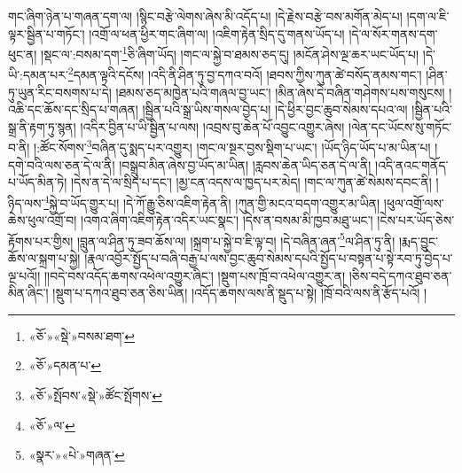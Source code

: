 གང་ཞིག་ཉེན་པ་གཞན་དག་ལ། །སྙིང་བརྩེ་ལེགས་ཞེས་མི་འདོད་པ། །དེ་རྗེས་བརྩེ་བས་མགོན་མེད་པ། །དག་ལ་ཇི་ལྟར་སྦྱིན་པ་གཏོང་། །འགྲོ་ལ་ཕན་ཕྱིར་གང་ཞིག་ལ། །འཇིག་རྟེན་སྲིད་དུ་གནས་ཡོད་པ། །དེ་ལ་སོར་གནས་དག་ཕུང་ན། །སྡང་ལ་:བསམ་དག་\footnote{«ཅོ་»«སྡེ་»བསམ་ཐག་}ཅི་ཞིག་ཡོད། །གང་ལ་སྐྱེ་བ་ཐམས་ཅད་དུ། །མངོན་ཤེས་ལྔ་ཆར་ཡང་ཡོད་པ། །དེ་ཡི་:དམན་པར་\footnote{«ཅོ་»དམན་པ་}དམན་ལྟའི་དངོས། །འདི་ནི་ཤིན་ཏུ་བྱ་དཀའ་བའོ། །ཐབས་ཀྱིས་ཀུན་ཚེ་བསོད་ནམས་གང་། །ཤིན་ཏུ་ཡུན་རིང་བསགས་པ་དེ། །ཐམས་ཅད་མཁྱེན་པའི་གཞལ་བྱ་ཡང་། །མིན་ཞེས་དེ་བཞིན་གཤེགས་པས་གསུངས། །འཆི་དང་ཆོས་དང་སྲིད་པ་གཞན། །སྦྱིན་པའི་སྒྲ་ཡིས་གསལ་བྱེད་པ། །དེ་ཕྱིར་བྱང་ཆུབ་སེམས་དཔའ་ལ། །སྦྱིན་པའི་སྒྲ་ནི་རྟག་ཏུ་སྙན། །འདིར་བྱིན་པ་ཡི་སྦྱིན་པ་ལས། །འབྲས་བུ་ཆེན་པོ་འབྱུང་འགྱུར་ཞེས། །ལེན་དང་ཡོངས་སུ་གཏོང་བ་ནི། །:ཚོང་སོགས་\footnote{«ཅོ་»སྤོབས་«སྡེ་»ཚོང་སྤོགས་}བཞིན་དུ་སྨད་པར་འགྱུར། །གང་ལ་སྔར་བྱས་སྡིག་པ་ཡང་། །ཡོད་ཉིད་ཡོད་པ་མ་ཡིན་པ། །དགེ་བའི་ལས་ཅན་དེ་ལ་ནི། །བསྒྲུབ་མིན་ཞེས་བྱ་ཡོད་མ་ཡིན། །རླབས་ཆེན་ཡིད་ཅན་དེ་ལ་ནི། །འདི་ནའང་གནོད་པ་ཡོད་མིན་ཏེ། །དེས་ན་དེ་ལ་སྲིད་པ་དང་། །མྱ་ངན་འདས་ལ་ཁྱད་པར་མེད། །གང་ལ་ཀུན་ཚེ་སེམས་དབང་ནི། །ཉིད་ལས་\footnote{«ཅོ་»ལ་}སྐྱེ་བ་ཡོད་གྱུར་པ། །དེ་ཀོ་རྒྱུ་ཅིས་འཇིག་རྟེན་ནི། །ཀུན་གྱི་མངའ་བདག་འགྱུར་མ་ཡིན། །ཕུལ་འགྲོ་ལས་ཆེས་ཕུལ་འགྲོ་བ། །འགའ་ཞིག་འཇིག་རྟེན་འདིར་ཡང་སྣང་། །དེས་ན་བསམ་མི་ཁྱབ་མཐུ་ཡང་། །ངེས་པར་ཡོད་ཅེས་རྟོགས་པར་གྱིས། །བླུན་ལ་ཤིན་ཏུ་ཟབ་ཆོས་ལ། །སྐྲག་པ་སྐྱེ་བ་ཇི་ལྟ་བ། །དེ་བཞིན་ཞན་\footnote{«སྣར་»«པེ་»གཞན་}ལ་ཤིན་ཏུ་ནི། །རྨད་བྱུང་ཆོས་ལ་སྐྲག་པ་སྐྱེ། །རྣལ་འབྱོར་སྤྱོད་པ་བཞི་བརྒྱ་པ་ལས་བྱང་ཆུབ་སེམས་དཔའི་སྤྱོད་པ་བསྟན་པ་སྟེ་རབ་ཏུ་བྱེད་པ་ལྔ་པའོ།། །།བདེ་བས་འདོད་ཆགས་འཕེལ་འགྱུར་ཞིང་། །སྡུག་པས་ཁྲོ་བ་འཕེལ་འགྱུར་ན། །ཅིས་བདེ་དཀའ་ཐུབ་ཅན་མིན་ཞིང་། །སྡུག་པ་དཀའ་ཐུབ་ཅན་ཅིས་ཡིན། །འདོད་ཆགས་ལས་ནི་སྡུད་པ་སྟེ། །ཁྲོ་བའི་ལས་ནི་རྩོད་པའོ། །
